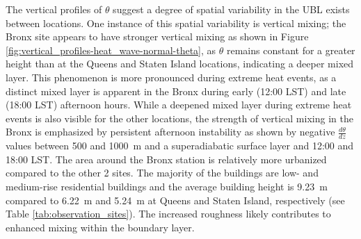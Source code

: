 \documentclass[11pt,a4paper]{article}
\begin{document}
The vertical profiles of $\theta$ suggest a degree of spatial variability in the UBL exists between locations. One instance of this spatial variability is vertical mixing; the Bronx site appears to have stronger vertical mixing as shown in Figure \ref{fig:vertical_profiles-heat_wave-normal-theta}, as $\theta$ remains constant for a greater height than at the Queens and Staten Island locations, indicating a deeper mixed layer. This phenomenon is more pronounced during extreme heat events, as a distinct mixed layer is apparent in the Bronx during early (12:00 LST) and late (18:00 LST) afternoon hours. While a deepened mixed layer during extreme heat events is also visible for the other locations, the strength of vertical mixing in the Bronx is emphasized by persistent afternoon instability as shown by negative $\frac{d\theta}{dz}$ values between 500 and \SI{1000}{\meter} and a superadiabatic surface layer and 12:00 and 18:00 LST. The area around the Bronx station is relatively more urbanized compared to the other 2 sites. The majority of the buildings are low- and medium-rise residential buildings and the average building height is \SI{9.23}{\meter} compared to \SI{6.22}{\meter} and  \SI{5.24}{\meter} at Queens and Staten Island, respectively (see Table \ref{tab:observation_sites}). The increased roughness likely contributes to enhanced mixing within the boundary layer.
\end{document}
